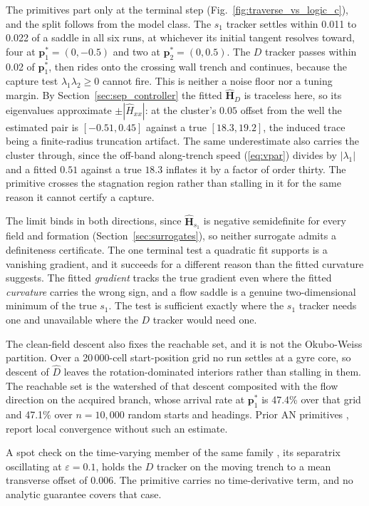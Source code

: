 \documentclass[lettersize,journal]{IEEEtran}
\begin{document}
The primitives part only at the terminal step
(Fig.~\ref{fig:traverse_vs_logic_c}), and the split follows from the
model class. The $s_1$ tracker
settles within 0.011 to 0.022 of a saddle in all six runs, at whichever
its initial tangent resolves toward, four at
$\mathbf{p}^*_1 = (0, -0.5)$ and two at $\mathbf{p}^*_2 = (0, 0.5)$. The
$D$ tracker passes within 0.02 of $\mathbf{p}^*_1$, then rides onto the
crossing wall trench and continues, because the capture test
$\lambda_1\lambda_2 \geq 0$ cannot fire. This
is neither a noise floor nor a tuning margin. By
Section~\ref{sec:sep_controller} the fitted $\hat{\mathbf{H}}_D$ is
traceless here, so its eigenvalues approximate
$\pm|\hat{H}_{xx}|$: at the cluster's $0.05$ offset from the well the
estimated pair is $[-0.51, 0.45]$ against a true $[18.3, 19.2]$, the
induced trace being a finite-radius truncation artifact. The same underestimate also
carries the cluster through, since the off-band along-trench speed
(\ref{eq:vpar}) divides by $|\lambda_1|$ and a fitted $0.51$ against a
true $18.3$ inflates it by a factor of order thirty. The primitive
crosses the stagnation region rather than stalling in it for the same
reason it cannot certify a capture.

The limit binds in both directions, since $\hat{\mathbf{H}}_{s_1}$
is negative semidefinite for every field and formation
(Section~\ref{sec:surrogates}), so neither surrogate admits a definiteness
certificate. The one terminal test a quadratic fit supports is a vanishing gradient, and it succeeds for a different reason than the fitted curvature suggests. The fitted \emph{gradient} tracks the true gradient even where the fitted \emph{curvature} carries the wrong sign, and a flow saddle is a genuine two-dimensional minimum of the true $s_1$. The test is sufficient exactly where the $s_1$ tracker needs one
and unavailable where the $D$ tracker would need one.

The clean-field descent also fixes the reachable set, and it is not the
Okubo-Weiss partition. Over a 20\,000-cell start-position grid no run
settles at a gyre core, so descent of $\hat{D}$ leaves the
rotation-dominated interiors rather than stalling in them. The
reachable set is the watershed of that descent composited with the flow
direction on the acquired branch, whose arrival rate at
$\mathbf{p}^*_1$ is 47.4\% over that grid and 47.1\% over $n =
10{,}000$ random starts and headings. Prior AN primitives
\cite{2}, \cite{3} report local convergence without such an estimate.

A spot check on the time-varying member of the same family \cite{11}, its separatrix oscillating at $\varepsilon = 0.1$, holds the $D$ tracker on the moving trench to a mean transverse offset of 0.006. The primitive carries no time-derivative term, and no analytic guarantee covers that case.
\end{document}
